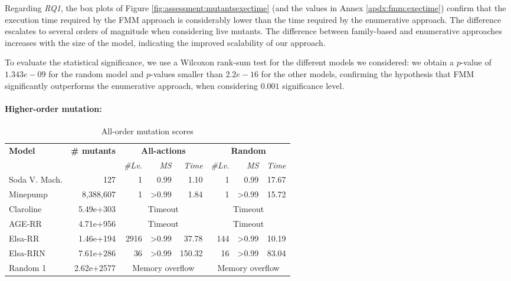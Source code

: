 Regarding \emph{RQ1}, the box plots of Figure \ref{fig:assessment:mutantsexectime} (and the values in Annex \ref{apdx:fmm:exectime}) confirm that the execution time required by the FMM approach is considerably lower than the time required by the enumerative approach. The difference escalates to several orders of magnitude when considering live mutants. The difference between family-based and enumerative approaches increases with the size of the model, indicating the improved scalability of our approach.

To evaluate the statistical significance, we use a Wilcoxon rank-sum test for the different models we considered: we obtain a $p$-value of $1.343e-09$ for the random model and $p$-values smaller than $2.2e-16$ for the other models, confirming the hypothesis that FMM significantly outperforms the enumerative approach, when considering $0.001$ significance level. 

\paragraph{Higher-order mutation:}

\begin{table}
\centering
\caption{All-order mutation scores}
\begin{small}
\begin{tabular}{l rrrrrrr}
\hline
\textbf{Model}	& \textbf{\# mutants}	& \multicolumn{3}{c}{\textbf{All-actions}}	& \multicolumn{3}{c}{\textbf{Random}}\\
	& 	& \textit{\#Lv.}	& \textit{MS} & \textit{Time}	&  \textit{\#Lv.}	& \textit{MS} & \textit{Time}	 \\
\hline 
Soda V. Mach.	&	127						& 1			& 0.99 & 1.10  & 1 & 0.99 & 17.67 \\
Minepump		&	8,388,607					& 1			& >0.99	& 1.84 & 1	& >0.99 & 15.72 \\
Claroline	&	5.49e+303	& \multicolumn{3}{c}{Timeout} & \multicolumn{3}{c}{Timeout} \\
AGE-RR		&	4.71e+956	 				& \multicolumn{3}{c}{Timeout} & \multicolumn{3}{c}{Timeout} \\
Elsa-RR		&	1.46e+194	& 2916	& >0.99	& 37.78  &  144	& >0.99 & 10.19 \\
Elsa-RRN		&	7.61e+286	& 36			& >0.99	& 150.32  & 16		& >0.99 & 83.04 \\
Random 1		&	2.62e+2577					& \multicolumn{3}{c}{Memory overflow} & \multicolumn{3}{c}{Memory overflow} \\
\hline
\end{tabular}
\end{small}
\label{tab:experiment:fmmexec:norderscore}
\end{table}


